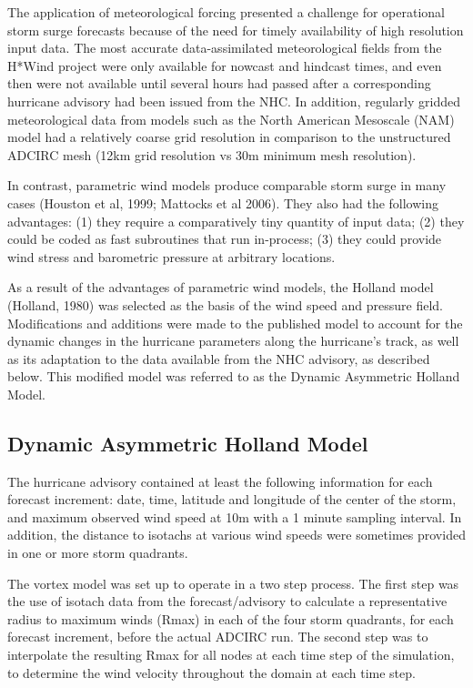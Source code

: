 \documentclass[12pt]{article}
\begin{document}
The application of meteorological forcing presented a challenge for 
operational storm surge forecasts because of the need for timely 
availability of high resolution input data. The most accurate 
data-assimilated meteorological fields from the H*Wind project were 
only available for nowcast and hindcast times, and even then were 
not available until several hours had passed after a corresponding 
hurricane advisory had been issued from the NHC. In addition, 
regularly gridded meteorological data from models such as the North 
American Mesoscale (NAM) model had a relatively coarse grid 
resolution in comparison to the unstructured ADCIRC mesh (12km grid 
resolution vs 30m minimum mesh resolution).

In contrast, parametric wind models produce comparable storm surge 
in many cases (Houston et al, 1999; Mattocks et al 2006). They also 
had the following advantages: (1) they require a comparatively tiny 
quantity of input data; (2) they could be coded as fast subroutines 
that run in-process; (3) they could provide wind stress and 
barometric pressure at arbitrary locations.

As a result of the advantages of parametric wind models, the Holland 
model (Holland, 1980) was selected as the basis of the wind speed 
and pressure field. Modifications and additions were made to the 
published model to account for the dynamic changes in the hurricane 
parameters along the hurricane's track, as well as its adaptation to 
the data available from the NHC advisory, as described below. This 
modified model was referred to as the Dynamic Asymmetric Holland 
Model.

\subsection{Dynamic Asymmetric Holland Model}

The hurricane advisory contained at least the following information 
for each forecast increment: date, time, latitude and longitude of 
the center of the storm, and maximum observed wind speed at 10m with 
a 1 minute sampling interval. In addition, the distance to isotachs 
at various wind speeds were sometimes provided in one or more storm 
quadrants.

The vortex model was set up to operate in a two step process. The 
first step was the use of isotach data from the forecast/advisory to 
calculate a representative radius to maximum winds (Rmax) in each of 
the four storm quadrants, for each forecast increment, before the 
actual ADCIRC run. The second step was to interpolate the resulting 
Rmax for all nodes at each time step of the simulation, to determine 
the wind velocity throughout the domain at each time step.
\end{document}
